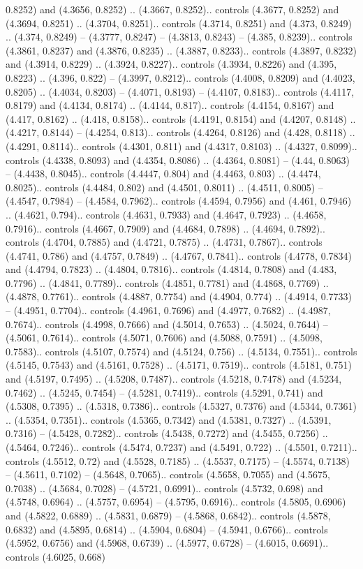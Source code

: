 0.8252) and (4.3656, 0.8252) .. (4.3667, 0.8252).. controls (4.3677, 0.8252) and (4.3694, 0.8251) .. (4.3704, 0.8251).. controls (4.3714, 0.8251) and (4.373, 0.8249) .. (4.374, 0.8249) -- (4.3777, 0.8247) -- (4.3813, 0.8243) -- (4.385, 0.8239).. controls (4.3861, 0.8237) and (4.3876, 0.8235) .. (4.3887, 0.8233).. controls (4.3897, 0.8232) and (4.3914, 0.8229) .. (4.3924, 0.8227).. controls (4.3934, 0.8226) and (4.395, 0.8223) .. (4.396, 0.822) -- (4.3997, 0.8212).. controls (4.4008, 0.8209) and (4.4023, 0.8205) .. (4.4034, 0.8203) -- (4.4071, 0.8193) -- (4.4107, 0.8183).. controls (4.4117, 0.8179) and (4.4134, 0.8174) .. (4.4144, 0.817).. controls (4.4154, 0.8167) and (4.417, 0.8162) .. (4.418, 0.8158).. controls (4.4191, 0.8154) and (4.4207, 0.8148) .. (4.4217, 0.8144) -- (4.4254, 0.813).. controls (4.4264, 0.8126) and (4.428, 0.8118) .. (4.4291, 0.8114).. controls (4.4301, 0.811) and (4.4317, 0.8103) .. (4.4327, 0.8099).. controls (4.4338, 0.8093) and (4.4354, 0.8086) .. (4.4364, 0.8081) -- (4.44, 0.8063) -- (4.4438, 0.8045).. controls (4.4447, 0.804) and (4.4463, 0.803) .. (4.4474, 0.8025).. controls (4.4484, 0.802) and (4.4501, 0.8011) .. (4.4511, 0.8005) -- (4.4547, 0.7984) -- (4.4584, 0.7962).. controls (4.4594, 0.7956) and (4.461, 0.7946) .. (4.4621, 0.794).. controls (4.4631, 0.7933) and (4.4647, 0.7923) .. (4.4658, 0.7916).. controls (4.4667, 0.7909) and (4.4684, 0.7898) .. (4.4694, 0.7892).. controls (4.4704, 0.7885) and (4.4721, 0.7875) .. (4.4731, 0.7867).. controls (4.4741, 0.786) and (4.4757, 0.7849) .. (4.4767, 0.7841).. controls (4.4778, 0.7834) and (4.4794, 0.7823) .. (4.4804, 0.7816).. controls (4.4814, 0.7808) and (4.483, 0.7796) .. (4.4841, 0.7789).. controls (4.4851, 0.7781) and (4.4868, 0.7769) .. (4.4878, 0.7761).. controls (4.4887, 0.7754) and (4.4904, 0.774) .. (4.4914, 0.7733) -- (4.4951, 0.7704).. controls (4.4961, 0.7696) and (4.4977, 0.7682) .. (4.4987, 0.7674).. controls (4.4998, 0.7666) and (4.5014, 0.7653) .. (4.5024, 0.7644) -- (4.5061, 0.7614).. controls (4.5071, 0.7606) and (4.5088, 0.7591) .. (4.5098, 0.7583).. controls (4.5107, 0.7574) and (4.5124, 0.756) .. (4.5134, 0.7551).. controls (4.5145, 0.7543) and (4.5161, 0.7528) .. (4.5171, 0.7519).. controls (4.5181, 0.751) and (4.5197, 0.7495) .. (4.5208, 0.7487).. controls (4.5218, 0.7478) and (4.5234, 0.7462) .. (4.5245, 0.7454) -- (4.5281, 0.7419).. controls (4.5291, 0.741) and (4.5308, 0.7395) .. (4.5318, 0.7386).. controls (4.5327, 0.7376) and (4.5344, 0.7361) .. (4.5354, 0.7351).. controls (4.5365, 0.7342) and (4.5381, 0.7327) .. (4.5391, 0.7316) -- (4.5428, 0.7282).. controls (4.5438, 0.7272) and (4.5455, 0.7256) .. (4.5464, 0.7246).. controls (4.5474, 0.7237) and (4.5491, 0.722) .. (4.5501, 0.7211).. controls (4.5512, 0.72) and (4.5528, 0.7185) .. (4.5537, 0.7175) -- (4.5574, 0.7138) -- (4.5611, 0.7102) -- (4.5648, 0.7065).. controls (4.5658, 0.7055) and (4.5675, 0.7038) .. (4.5684, 0.7028) -- (4.5721, 0.6991).. controls (4.5732, 0.698) and (4.5748, 0.6964) .. (4.5757, 0.6954) -- (4.5795, 0.6916).. controls (4.5805, 0.6906) and (4.5822, 0.6889) .. (4.5831, 0.6879) -- (4.5868, 0.6842).. controls (4.5878, 0.6832) and (4.5895, 0.6814) .. (4.5904, 0.6804) -- (4.5941, 0.6766).. controls (4.5952, 0.6756) and (4.5968, 0.6739) .. (4.5977, 0.6728) -- (4.6015, 0.6691).. controls (4.6025, 0.668) 